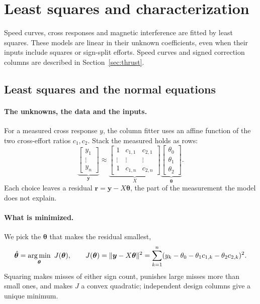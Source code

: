 \section{Least squares and characterization}
\label{sec:char}

Speed curves, cross responses and magnetic interference are fitted by least
squares. These models are linear in their unknown coefficients, even when
their inputs include squares or sign-split efforts. Speed curves and signed
correction columns are described in Section~\ref{sec:thrust}.

\subsection{Least squares and the normal equations}

\paragraph{The unknowns, the data and the inputs.} For a measured cross response
$y$, the column fitter uses an affine function of the two cross-effort ratios
$c_1,c_2$. Stack the measured holds as rows:
\[
  \underbrace{\begin{bmatrix}y_1\\\vdots\\y_n\end{bmatrix}}_{\bm y}
  \approx
  \underbrace{\begin{bmatrix}1&c_{1,1}&c_{2,1}\\
  \vdots&\vdots&\vdots\\1&c_{1,n}&c_{2,n}\end{bmatrix}}_X
  \underbrace{\begin{bmatrix}\theta_0\\\theta_1\\\theta_2\end{bmatrix}}_{\bm\theta}.
\]
Each choice leaves a residual $\bm r=\bm y-X\bm\theta$, the part of the
measurement the model does not explain.

\paragraph{What is minimized.} We pick the $\bm\theta$ that makes the residual
smallest,
\[
  \hat{\bm\theta} = \argmin_{\bm\theta}\ J(\bm\theta),\qquad
  J(\bm\theta) = \|\bm y - X\bm\theta\|^2 = \sum_{k=1}^{n}(y_k-\theta_0-\theta_1c_{1,k}-\theta_2c_{2,k})^2 .
\]
Squaring makes misses of either sign count, punishes large misses more than
small ones, and makes $J$ a convex quadratic; independent design columns give a unique minimum.


